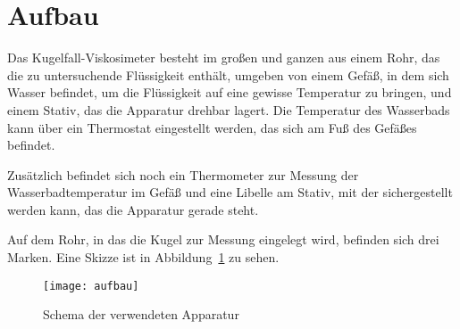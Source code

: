 
\section{Aufbau}

Das Kugelfall-Viskosimeter besteht im großen und ganzen aus einem Rohr,
das die zu untersuchende Flüssigkeit enthält, umgeben von einem Gefäß,
in dem sich Wasser befindet, um die Flüssigkeit auf eine gewisse
Temperatur zu bringen, und einem Stativ, das die Apparatur drehbar
lagert. Die Temperatur des Wasserbads kann über ein Thermostat
eingestellt werden, das sich am Fuß des Gefäßes befindet.

Zusätzlich befindet sich noch ein Thermometer zur Messung der
Wasserbadtemperatur im Gefäß und eine Libelle am Stativ, mit der
sichergestellt werden kann, das die Apparatur gerade steht.

Auf dem Rohr, in das die Kugel zur Messung eingelegt wird, befinden sich
drei Marken. Eine Skizze ist in Abbildung~\ref{fig:aufbau} zu sehen.

\begin{figure}
  \centering
  \texttt{[image: aufbau]}
  \caption{Schema der verwendeten Apparatur}
  \label{fig:aufbau}
\end{figure}
